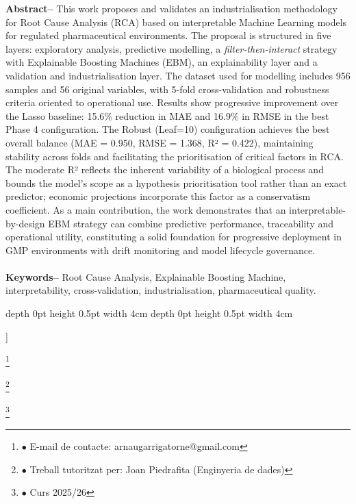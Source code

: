 \documentclass[10pt,a4paper,twocolumn,twoside]{article}
\newcommand\blfootnote[1]{%
  \begingroup
  \renewcommand\thefootnote{}\footnote{#1}%
  \addtocounter{footnote}{-1}%
  \endgroup
}
\begin{document}
\begin{@twocolumnfalse}
\begin{center}
{\textbf{Abstract--} This work proposes and validates an industrialisation methodology for Root Cause Analysis (RCA) based on interpretable Machine Learning models for regulated pharmaceutical environments. The proposal is structured in five layers: exploratory analysis, predictive modelling, a \emph{filter-then-interact} strategy with Explainable Boosting Machines (EBM), an explainability layer and a validation and industrialisation layer. The dataset used for modelling includes 956 samples and 56 original variables, with 5-fold cross-validation and robustness criteria oriented to operational use. Results show progressive improvement over the Lasso baseline: 15.6\% reduction in MAE and 16.9\% in RMSE in the best Phase 4 configuration. The Robust (Leaf=10) configuration achieves the best overall balance (MAE = 0.950, RMSE = 1.368, R² = 0.422), maintaining stability across folds and facilitating the prioritisation of critical factors in RCA. The moderate R² reflects the inherent variability of a biological process and bounds the model's scope as a hypothesis prioritisation tool rather than an exact predictor; economic projections incorporate this factor as a conservatism coefficient. As a main contribution, the work demonstrates that an interpretable-by-design EBM strategy can combine predictive performance, traceability and operational utility, constituting a solid foundation for progressive deployment in GMP environments with drift monitoring and model lifecycle governance.
\\
\\
\textbf{Keywords-- } Root Cause Analysis, Explainable Boosting Machine, interpretability, cross-validation, industrialisation, pharmaceutical quality.\\
}

\bigskip

{\vrule depth 0pt height 0.5pt width 4cm\hspace{7.5pt}%
%
\hspace{7.5pt}\vrule depth 0pt height 0.5pt width 4cm\relax}

\end{center}

\bigskip

\end{@twocolumnfalse}]

\blfootnote{$\bullet$ E-mail de contacte: arnaugarrigatorne@gmail.com}
\blfootnote{$\bullet$ Treball tutoritzat per: Joan Piedrafita (Enginyeria de dades)}
\blfootnote{$\bullet$ Curs 2025/26}
\end{document}
